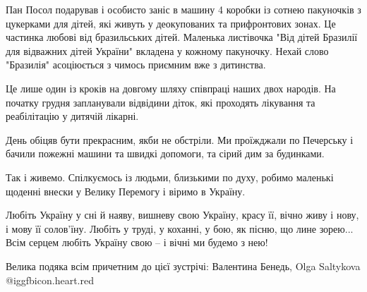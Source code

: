 Пан Посол подарував і особисто заніс в машину 4 коробки із сотнею пакуночків з
цукерками для дітей, які живуть у деокупованих та прифронтових зонах. Це
частинка любові від бразильських дітей. Маленька листівочка "Від дітей Бразилії
для відважних дітей України" вкладена у кожному пакуночку. Нехай слово
"Бразилія" асоціюється з чимось приємним вже з дитинства.

Це лише один із кроків на довгому шляху співпраці наших двох народів. На
початку грудня запланували відвідини діток, які проходять лікування  та
реабілітацію у  дитячій лікарні. 

День обіцяв бути прекрасним, якби не обстріли. Ми проїжджали по Печерську і
бачили пожежні машини та швидкі допомоги, та сірий дим за будинками. 

Так і живемо. Спілкуємось із людьми, близькими по духу, робимо маленькі щоденні
внески у Велику Перемогу і віримо в Україну. 

\obeycr
Любіть Україну у сні й наяву,
вишневу свою Україну,
красу її, вічно живу і нову,
і мову її солов'їну.
Любіть у труді, у коханні, у бою,
як пісню, що лине зорею...
Всім серцем любіть Україну свою -- 
і вічні ми будемо з нею!
\restorecr

Велика подяка всім причетним до цієї зустрічі: Валентина Бенедь, Olga Saltykova
@igg{fbicon.heart.red}

